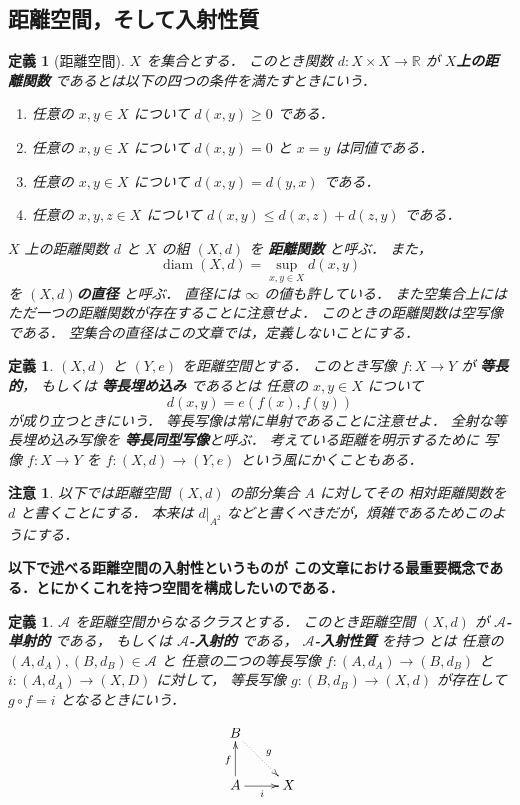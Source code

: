 \documentclass[leqno, 12pt]{jsarticle}
\newtheorem{df}[thm]{定義}
\newtheorem*{rmk}{注意}
\newcommand{\rr}{\mathbb{R}}
\DeclareMathOperator{\di}{diam}
\begin{document}
\subsection{距離空間，そして入射性質}
\begin{df}[距離空間]\label{df:intro:metric}
$X$
を集合とする．
このとき関数
$d\colon  X\times X\to \rr$
が
\textbf{$X$上の距離関数}
であるとは以下の四つの条件を満たすときにいう．
\begin{enumerate}
\item 
任意の
$x, y\in X$
について
$d(x, y)\ge 0$
である．
\item 
任意の
$x, y\in X$
について
$d(x, y)=0$
と
$x=y$
は同値である．
\item 
任意の
$x, y\in X$
について
$d(x, y)=d(y, x)$
である．
\item 
任意の
$x, y, z\in X$
について
$d(x, y)\le d(x, z)+d(z, y)$
である．
\end{enumerate}
$X$
上の距離関数
$d$
と
$X$
の組
$(X, d)$
を
\textbf{距離関数}
と呼ぶ．
また，
\[
\di(X, d)=\sup_{x, y\in X}d(x, y)
\]
を
\textbf{$(X, d)$の直径}
と呼ぶ．
直径には
$\infty$
の値も許している．
また空集合上にはただ一つの距離関数が存在することに注意せよ．
このときの距離関数は空写像である．
空集合の直径はこの文章では，定義しないことにする．
\end{df}

\begin{df}\label{df:intro:iso}
$(X, d)$
と
$(Y, e)$
を距離空間とする．
このとき写像
$f: X\to Y$
が
\textbf{等長的}，
もしくは
\textbf{等長埋め込み}
であるとは
任意の
$x, y\in X$
について
\[
d(x, y)=e(f(x), f(y))
\]
が成り立つときにいう．
等長写像は常に単射であることに注意せよ．
全射な等長埋め込み写像を
\textbf{等長同型写像}と呼ぶ．
考えている距離を明示するために
写像
$f\colon 
 X\to Y$
 を
 $f\colon   (X, d)\to (Y, e)$
という風にかくこともある．
\end{df}



\begin{rmk}
以下では距離空間
$(X, d)$
の部分集合
$A$
に対してその
相対距離関数を
$d$
と書くことにする．
本来は
$d|_{A^2}$
などと書くべきだが，煩雑であるためこのようにする．
\end{rmk}





\textbf{以下で述べる距離空間の入射性というものが
この文章における最重要概念である．とにかくこれを持つ空間を構成したいのである．}


\begin{df}\label{df:intor:inj}
$\mathscr{A}$
を距離空間からなるクラスとする．
このとき距離空間
$(X, d)$
が
\textbf{$\mathscr{A}$-単射的}
である，
もしくは
\textbf{$\mathscr{A}$-入射的}
である，
\textbf{$\mathscr{A}$-入射性質}
を持つ
とは
任意の
$(A, d_A), (B, d_B)\in \mathscr{A}$
と
任意の二つの等長写像
$f\colon  (A, d_A)\to (B, d_B)$
と
$i\colon (A, d_A)\to (X, D)$
に対して，
等長写像
$g\colon  (B, d_B)\to (X, d)$
が存在して
$g\circ f=i$
となるときにいう．


\[
\xymatrix{
B \ar@{.>}[dr]^{g} & \\
A \ar[r]_i \ar[u]^f & X
}
\]
\end{df}
\end{document}
